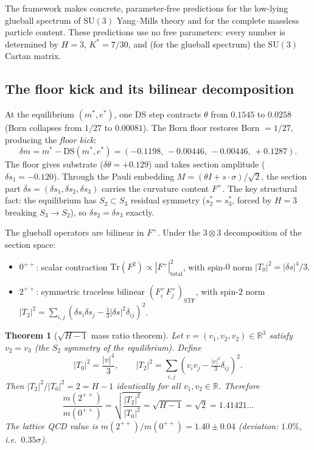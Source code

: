 \documentclass[11pt,a4paper]{article}
\newtheorem{theorem}{Theorem}[section]
\theoremstyle{definition}
\theoremstyle{remark}
\newcommand{\R}{\mathbb{R}}
\newcommand{\SU}{\mathrm{SU}}
\begin{document}
The framework makes concrete, parameter-free predictions for the low-lying glueball spectrum of $\SU(3)$ Yang--Mills theory and for the complete massless particle content. These predictions use no free parameters: every number is determined by $H=3$, $K^*=7/30$, and (for the glueball spectrum) the $\SU(3)$ Cartan matrix.

\subsection{The floor kick and its bilinear decomposition}

At the equilibrium $(m^*,e^*)$, one DS step contracts $\theta$ from $0.1545$ to $0.0258$ (Born collapses from $1/27$ to $0.00081$). The Born floor restores Born $=1/27$, producing the \emph{floor kick}:
\begin{equation}\label{eq:floor_kick}
\delta m = m^* - \mathrm{DS}(m^*,e^*) = (-0.1198,\,-0.00446,\,-0.00446,\,+0.1287).
\end{equation}
The floor gives substrate ($\delta\theta=+0.129$) and takes section amplitude ($\delta s_1=-0.120$). Through the Pauli embedding $M=({\theta}I+s\cdot\sigma)/\sqrt{2}$, the section part $\delta s=(\delta s_1,\delta s_2,\delta s_3)$ carries the curvature content $F^+$. The key structural fact: the equilibrium has $S_2\subset S_3$ residual symmetry ($s_2^*=s_3^*$, forced by $H=3$ breaking $S_3\to S_2$), so $\delta s_2=\delta s_3$ exactly.

The glueball operators are bilinear in $F^+$. Under the $3\otimes 3$ decomposition of the section space:
\begin{itemize}[nosep]
\item $0^{++}$: scalar contraction $\mathrm{Tr}(F^2)\propto|F^+|^2_{\mathrm{total}}$, with spin-$0$ norm $|T_0|^2=|\delta s|^4/3$.
\item $2^{++}$: symmetric traceless bilinear $(F^+_iF^+_j)_{\mathrm{STF}}$, with spin-$2$ norm $|T_2|^2=\sum_{i,j}(\delta s_i\delta s_j-\tfrac{1}{3}|\delta s|^2\delta_{ij})^2$.
\end{itemize}

\begin{theorem}[$\sqrt{H-1}$ mass ratio theorem]\label{thm:glueball_spectrum}
Let $v=(v_1,v_2,v_2)\in\R^3$ satisfy $v_2=v_3$ (the $S_2$ symmetry of the equilibrium). Define
\[
|T_0|^2 = \frac{|v|^4}{3}, \qquad |T_2|^2 = \sum_{i,j}\!\left(v_iv_j-\tfrac{|v|^2}{3}\delta_{ij}\right)^{\!2}.
\]
Then $|T_2|^2/|T_0|^2=2=H-1$ identically for all $v_1,v_2\in\R$. Therefore
\begin{equation}\label{eq:sqrt2}
\frac{m(2^{++})}{m(0^{++})} = \sqrt{\frac{|T_2|^2}{|T_0|^2}} = \sqrt{H-1} = \sqrt{2} = 1.41421\ldots
\end{equation}
The lattice QCD value is $m(2^{++})/m(0^{++})=1.40\pm 0.04$ (deviation: $1.0\%$, i.e.\ $0.35\sigma$).
\end{theorem}
\end{document}
